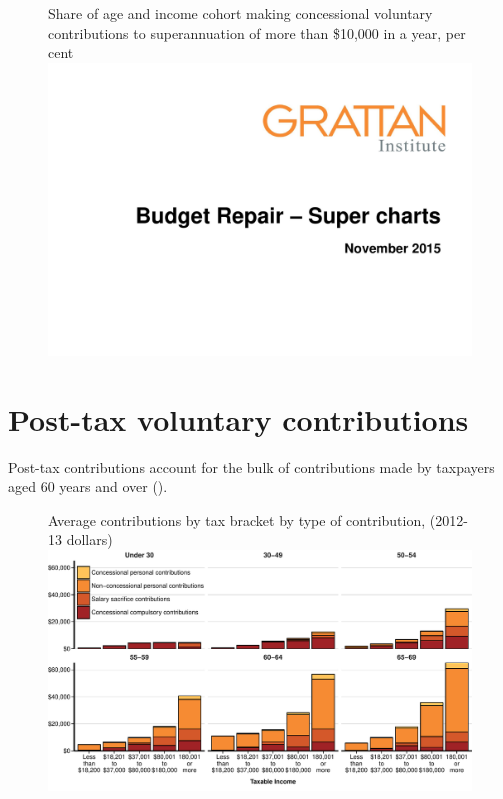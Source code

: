 \documentclass{grattanAlpha}
\begin{document}
\begin{figure}
%
{Share of age and income cohort making concessional voluntary contributions to superannuation of more than \$10,000 in a year, per cent}\label{fig:SUPER-A-7}
\includegraphics[width=\columnwidth,page=41]{super-atlas/PPTX.pdf}
\end{figure}

\section{Post-tax voluntary contributions}
Post-tax contributions account for the bulk of contributions made by taxpayers aged 60 years and over (). 
\begin{figure}
%
{Average contributions by tax bracket by type of contribution, (2012-13 dollars)}\label{fig:SUPER-A-8}
\includegraphics[width=\textwidth]{super-atlas/appendices/figure/A8-1.pdf}
\end{figure}
\end{document}
